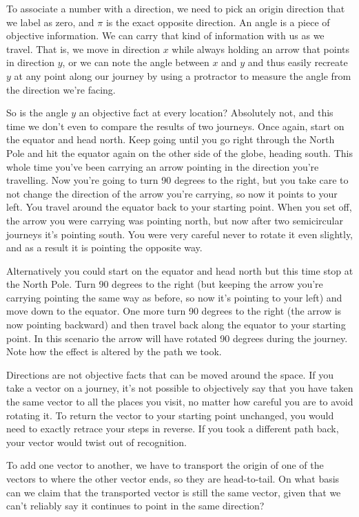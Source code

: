 To associate a number with a direction, we need to pick an origin direction that we label as zero, and $\pi$ is the exact opposite direction. An angle is a piece of objective information. We can carry that kind of information with us as we travel. That is, we move in direction $x$ while always holding an arrow that points in direction $y$, or we can note the angle between $x$ and $y$ and thus easily recreate $y$ at any point along our journey by using a protractor to measure the angle from the direction we're facing.

So is the angle $y$ an objective fact at every location? Absolutely not, and this time we don't even to compare the results of two journeys. Once again, start on the equator and head north. Keep going until you go right through the North Pole and hit the equator again on the other side of the globe, heading south. This whole time you've been carrying an arrow pointing in the direction you're travelling. Now you're going to turn 90 degrees to the right, but you take care to not change the direction of the arrow you're carrying, so now it points to your left. You travel around the equator back to your starting point. When you set off, the arrow you were carrying was pointing north, but now after two semicircular journeys it's pointing south. You were very careful never to rotate it even slightly, and as a result it is pointing the opposite way.

Alternatively you could start on the equator and head north but this time stop at the North Pole. Turn 90 degrees to the right (but keeping the arrow you're carrying pointing the same way as before, so now it's pointing to your left) and move down to the equator. One more turn 90 degrees to the right (the arrow is now pointing backward) and then travel back along the equator to your starting point. In this scenario the arrow will have rotated 90 degrees during the journey. Note how the effect is altered by the path we took.

Directions are not objective facts that can be moved around the space. If you take a vector on a journey, it's not possible to objectively say that you have taken the same vector to all the places you visit, no matter how careful you are to avoid rotating it. To return the vector to your starting point unchanged, you would need to exactly retrace your steps in reverse. If you took a different path back, your vector would twist out of recognition.

To add one vector to another, we have to transport the origin of one of the vectors to where the other vector ends, so they are head-to-tail. On what basis can we claim that the transported vector is still the same vector, given that we can't reliably say it continues to point in the same direction?

